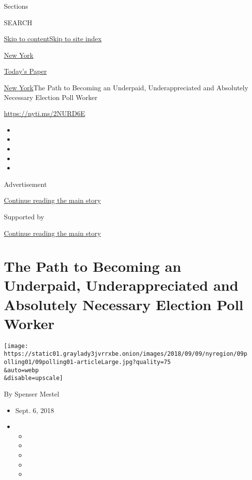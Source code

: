 Sections

SEARCH

\protect\hyperlink{site-content}{Skip to
content}\protect\hyperlink{site-index}{Skip to site index}

\href{https://www.nytimes3xbfgragh.onion/section/nyregion}{New York}

\href{https://myaccount.nytimes3xbfgragh.onion/auth/login?response_type=cookie\&client_id=vi}{}

\href{https://www.nytimes3xbfgragh.onion/section/todayspaper}{Today's
Paper}

\href{/section/nyregion}{New York}\textbar{}The Path to Becoming an
Underpaid, Underappreciated and Absolutely Necessary Election Poll
Worker

\url{https://nyti.ms/2NURD6E}

\begin{itemize}
\item
\item
\item
\item
\item
\end{itemize}

Advertisement

\protect\hyperlink{after-top}{Continue reading the main story}

Supported by

\protect\hyperlink{after-sponsor}{Continue reading the main story}

\hypertarget{the-path-to-becoming-an-underpaid-underappreciated-and-absolutely-necessary-election-poll-worker}{%
\section{The Path to Becoming an Underpaid, Underappreciated and
Absolutely Necessary Election Poll
Worker}\label{the-path-to-becoming-an-underpaid-underappreciated-and-absolutely-necessary-election-poll-worker}}

\texttt{[image: https://static01.graylady3jvrrxbe.onion/images/2018/09/09/nyregion/09polling01/09polling01-articleLarge.jpg?quality=75\\\&auto=webp\\\&disable=upscale]}

By Spenser Mestel

\begin{itemize}
\item
  Sept. 6, 2018
\item
  \begin{itemize}
  \item
  \item
  \item
  \item
  \item
  \end{itemize}
\end{itemize}

